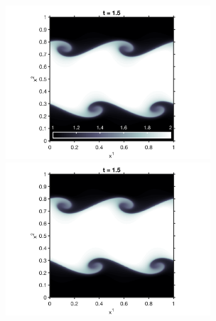 \documentclass[letterpaper]{jpconf}
\begin{document}
\begin{figure}[h]
  \centering
  \begin{minipage}{18pc}
    \includegraphics[width=18pc]{./Figures/KelvinHelmholtz_15_Astronum_2018}
  \end{minipage}\hspace{0.5pc}
  \begin{minipage}{18pc}
    \includegraphics[width=18pc]{./Figures/KelvinHelmholtz_15_noLim_Astronum_2018}
  \end{minipage} \\
  \begin{minipage}{18pc}

\end{minipage}
\end{figure}
\end{document}
